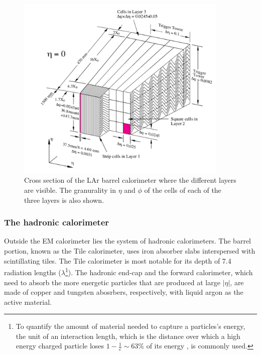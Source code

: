 \begin{figure}[htbp]
  \begin{center}
      \includegraphics[width=0.9\textwidth]{Fig2/EM_acordionstructure.pdf}
    \caption{Cross section of the LAr barrel calorimeter where the different layers are visible. The granurality in $\eta$ and $\phi$ of the cells of each of the three layers is also shown.}
    \label{fig:EMacordion}
  \end{center}
\end{figure}



\subsubsection{The hadronic calorimeter}\label{sec:Tile}


Outside the EM calorimeter lies the system of hadronic calorimeters. The barrel portion, known as the Tile calorimeter, uses iron absorber slabs interspersed with scintillating tiles. The Tile calorimeter is most notable for its depth of 7.4 radiation lengths ($\lambda$\footnote{To quantify the amount of material needed to capture a particles's energy, the unit of an interaction length, which is the distance over which a high energy charged particle loses $1-\frac{1}{e}\sim 63$\% of its energy , is commonly used.}). The hadronic end-cap and the forward calorimeter, which need to absorb the more energetic particles that are produced at large $|\eta|$, are made of copper and tungsten abosrbers, respectively, with liquid argon as the active material.

